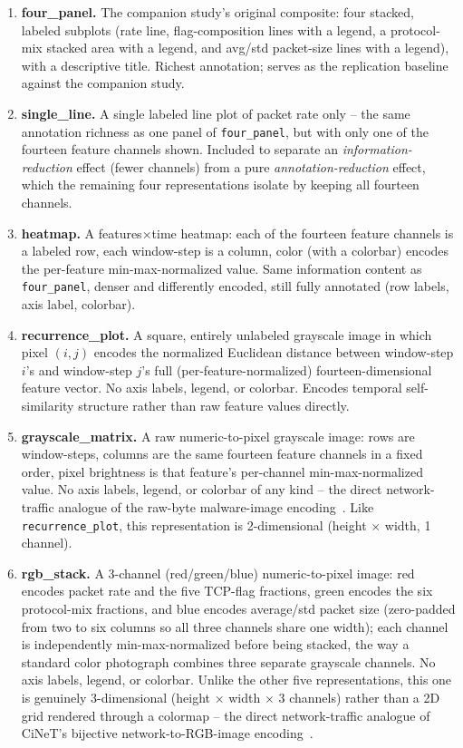 \documentclass[11pt]{article}
\begin{document}
\begin{enumerate}
\item \textbf{four\_panel.} The companion study's original composite: four stacked, labeled
subplots (rate line, flag-composition lines with a legend, a protocol-mix stacked area with a
legend, and avg/std packet-size lines with a legend), with a descriptive title. Richest annotation;
serves as the replication baseline against the companion study.
\item \textbf{single\_line.} A single labeled line plot of packet rate only -- the same annotation
richness as one panel of \texttt{four\_panel}, but with only one of the fourteen feature channels
shown. Included to separate an \emph{information-reduction} effect (fewer channels) from a pure
\emph{annotation-reduction} effect, which the remaining four representations isolate by keeping all
fourteen channels.
\item \textbf{heatmap.} A features$\times$time heatmap: each of the fourteen feature channels is a
labeled row, each window-step is a column, color (with a colorbar) encodes the per-feature
min-max-normalized value. Same information content as \texttt{four\_panel}, denser and differently
encoded, still fully annotated (row labels, axis label, colorbar).
\item \textbf{recurrence\_plot.} A square, entirely unlabeled grayscale image in which pixel
$(i,j)$ encodes the normalized Euclidean distance between window-step $i$'s and window-step $j$'s
full (per-feature-normalized) fourteen-dimensional feature vector. No axis labels, legend, or
colorbar. Encodes temporal self-similarity structure rather than raw feature values directly.
\item \textbf{grayscale\_matrix.} A raw numeric-to-pixel grayscale image: rows are window-steps,
columns are the same fourteen feature channels in a fixed order, pixel brightness is that feature's
per-channel min-max-normalized value. No axis labels, legend, or colorbar of any kind -- the direct
network-traffic analogue of the raw-byte malware-image encoding~\cite{nataraj2011malware}. Like
\texttt{recurrence\_plot}, this representation is 2-dimensional (height $\times$ width, 1 channel).
\item \textbf{rgb\_stack.} A 3-channel (red/green/blue) numeric-to-pixel image: red encodes packet
rate and the five TCP-flag fractions, green encodes the six protocol-mix fractions, and blue
encodes average/std packet size (zero-padded from two to six columns so all three channels share
one width); each channel is independently min-max-normalized before being stacked, the way a
standard color photograph combines three separate grayscale channels. No axis labels, legend, or
colorbar. Unlike the other five representations, this one is genuinely 3-dimensional (height
$\times$ width $\times$ 3 channels) rather than a 2D grid rendered through a colormap -- the direct
network-traffic analogue of CiNeT's bijective network-to-RGB-image encoding~\cite{bijective2025}.
\end{enumerate}
\end{document}
